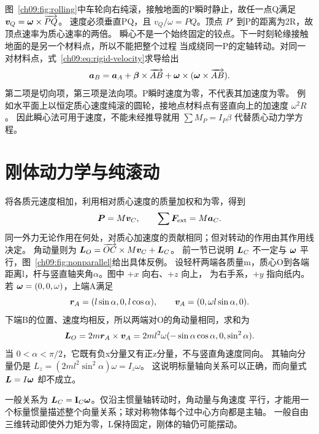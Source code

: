 {图~\ref{ch09:fig:rolling}中车轮向右纯滚，接触地面的P瞬时静止，故任一点Q满足
$\bm{v}_Q=\bm{\omega}\times\overrightarrow{PQ}$。
速度必须垂直PQ，且 $v_Q/\omega=PQ$。顶点 $P'$ 到P的距离为2R，故顶点速率为质心速率的两倍。
\rollingKinematicsDiagram
瞬心不是一个始终固定的铰点。下一时刻轮缘接触地面的是另一个材料点，所以不能把整个过程
当成绕同一P的定轴转动。对同一对材料点，式~\eqref{ch09:eq:rigid-velocity}求导给出
\begin{equation}
 \bm{a}_B=\bm{a}_A+\bm{\beta}\times\overrightarrow{AB}
 +\bm{\omega}\times(\bm{\omega}\times\overrightarrow{AB}).
\end{equation}
第二项是切向项，第三项是法向项。P瞬时速度为零，不代表其加速度为零。
例如水平面上以恒定质心速度纯滚的圆轮，接地点材料点有竖直向上的加速度 $\omega^2R$。
因此瞬心法可用于速度，不能未经推导就用 $\sum M_P=I_P\beta$ 代替质心动力学方程。

\section{刚体动力学与纯滚动}
将各质元速度相加，利用相对质心速度的质量加权和为零，得到
\begin{equation}
 \bm{P}=M\bm{v}_C,\qquad \sum\bm{F}_{\rm ext}=M\bm{a}_C.
\end{equation}
同一外力无论作用在何处，对质心加速度的贡献相同；但对转动的作用由其作用线决定。
角动量则为 $\bm{L}_O=\overrightarrow{OC}\times M\bm{v}_C+\bm{L}_C$。
前一节已说明 $\bm{L}_C$ 不一定与 $\bm{\omega}$ 平行，图~\ref{ch09:fig:nonparallel}给出具体反例。
\nonparallelAngularDiagram
设轻杆两端各质量m，质心O到各端距离l，杆与竖直轴夹角$\alpha$。图中 $+x$ 向右、$+z$ 向上，
为右手系，$+y$ 指向纸内。若 $\bm{\omega}=(0,0,\omega)$，上端A满足
\begin{equation}
 \bm{r}_A=(l\sin\alpha,0,l\cos\alpha),\qquad
 \bm{v}_A=(0,\omega l\sin\alpha,0).
\end{equation}
下端B的位置、速度均相反，所以两端对O的角动量相同，求和为
\begin{equation}
 \bm{L}_O=2m\bm{r}_A\times\bm{v}_A
 =2ml^2\omega(-\sin\alpha\cos\alpha,0,\sin^2\alpha).
\end{equation}
当 $0<\alpha<\pi/2$，它既有负x分量又有正z分量，不与竖直角速度同向。
其轴向分量仍是 $L_z=(2ml^2\sin^2\alpha)\omega=I_z\omega$。
这说明标量轴向关系可以正确，而向量式 $\bm{L}=I\bm{\omega}$ 却不成立。

一般关系为 $\bm{L}_C=\mathbf I_C\bm{\omega}$。仅沿主惯量轴转动时，角动量与角速度
平行，才能用一个标量惯量描述整个向量关系；球对称物体每个过中心方向都是主轴。
一般自由三维转动即使外力矩为零，L保持固定，刚体的轴仍可能摆动。

}
